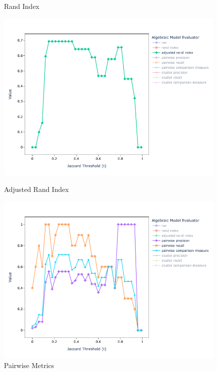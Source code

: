 \documentclass[lettersize,journal]{IEEEtran}
\begin{document}
\begin{figure}
\begin{minipage}{0.49\textwidth}
            \caption{Rand Index}
            \label{fig:mini-alg-rand}
        \end{minipage}    
        \begin{minipage}{0.49\textwidth}
            \centering
            \includegraphics[width=\textwidth]{mini-alg-adj-rand}
            \caption{Adjusted Rand Index}
            \label{fig:mini-alg-adj-rand}
        \end{minipage}    
        \begin{minipage}{0.49\textwidth}
            \centering
            \includegraphics[width=\textwidth]{mini-alg-pp}
            \caption{Pairwise Metrics}
            \label{fig:mini-alg-pp}
        \end{minipage}    

\end{figure}
\end{document}
